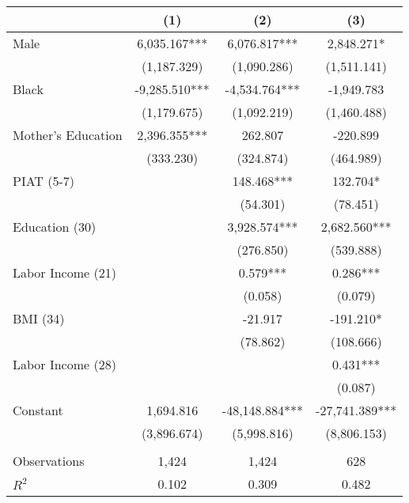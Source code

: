 \begin{tabular}{lccc} \hline
 & (1) & (2) & (3) \\ \midrule
Male & 6,035.167*** & 6,076.817*** & 2,848.271* \\
 & (1,187.329) & (1,090.286) & (1,511.141) \\
Black & -9,285.510*** & -4,534.764*** & -1,949.783 \\
 & (1,179.675) & (1,092.219) & (1,460.488) \\
Mother's Education & 2,396.355*** & 262.807 & -220.899 \\
 & (333.230) & (324.874) & (464.989) \\
PIAT (5-7) &  & 148.468*** & 132.704* \\
 &  & (54.301) & (78.451) \\
Education (30) &  & 3,928.574*** & 2,682.560*** \\
 &  & (276.850) & (539.888) \\
Labor Income (21) &  & 0.579*** & 0.286*** \\
 &  & (0.058) & (0.079) \\
BMI (34)&  & -21.917 & -191.210* \\
 &  & (78.862) & (108.666) \\
Labor Income (28) &  &  & 0.431*** \\
 &  &  & (0.087) \\
Constant & 1,694.816 & -48,148.884*** & -27,741.389*** \\
 & (3,896.674) & (5,998.816) & (8,806.153) \\ \\ \midrule
Observations & 1,424 & 1,424 & 628 \\
$R^2$ & 0.102 & 0.309 & 0.482 \\ \bottomrule
\end{tabular}
